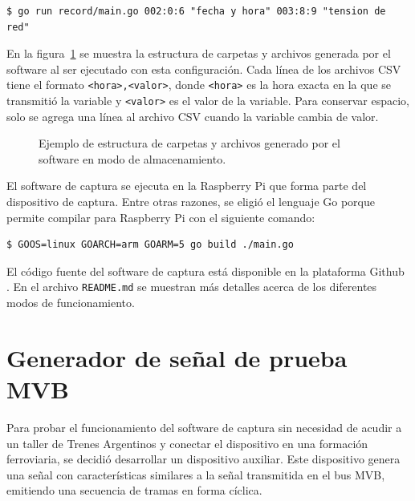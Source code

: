 \begin{lstlisting}
$ go run record/main.go 002:0:6 "fecha y hora" 003:8:9 "tension de red"
\end{lstlisting}

\pagebreak

En la figura~\ref{fig:carpetas} se muestra la estructura de carpetas y archivos generada por el software al ser ejecutado con esta configuración.
Cada línea de los archivos CSV tiene el formato \texttt{<hora>,\allowbreak <valor>}, donde \texttt{<hora>} es la hora exacta en la que se transmitió la variable y \texttt{<valor>} es el valor de la variable.
Para conservar espacio, solo se agrega una línea al archivo CSV cuando la variable cambia de valor.

\begin{figure}[htbp]
	\centering
    {
        \renewcommand{\baselinestretch}{0.9}
        \ttfamily
        \fontsize{9pt}{9pt}\selectfont
        
    }
	\caption{Ejemplo de estructura de carpetas y archivos generado por el software en modo de almacenamiento.}
    \label{fig:carpetas}
\end{figure}
\renewcommand{\baselinestretch}{1.0}

El software de captura se ejecuta en la Raspberry Pi que forma parte del dispositivo de captura.
Entre otras razones, se eligió el lenguaje Go porque permite compilar para Raspberry Pi con el siguiente comando:

\begin{lstlisting}
$ GOOS=linux GOARCH=arm GOARM=5 go build ./main.go
\end{lstlisting}

El código fuente del software de captura está disponible en la plataforma Github \cite{mvbparse-go}.
En el archivo \texttt{README.md} se muestran más detalles acerca de los diferentes modos de funcionamiento.

\section{Generador de señal de prueba MVB}
\label{sec:generador}

Para probar el funcionamiento del software de captura sin necesidad de acudir a un taller de Trenes Argentinos y conectar el dispositivo en una formación ferroviaria, se decidió desarrollar un dispositivo auxiliar. Este dispositivo genera una señal con características similares a la señal transmitida en el bus MVB, emitiendo una secuencia de tramas en forma cíclica.

